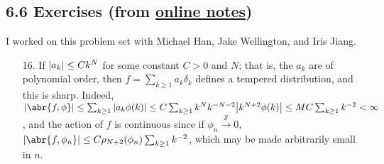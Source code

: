 \documentclass[11pt,leqno]{article}
\theoremstyle{plain}
\theoremstyle{definition}
\numberwithin{equation}{section}
\numberwithin{lem}{section}
\begin{document}
\subsection*{6.6 Exercises (from \href{https://users.oden.utexas.edu/~arbogast/appMath08c.pdf}{online notes})}
I worked on this problem set with Michael Han, Jake Wellington, and Iris Jiang.
\begin{enumerate}
    \item[16.] If $\abs{a_k}\leq Ck^N$ for some constant $C>0$ and $N$; that is, the $a_k$ are of polynomial order, then $f = \sum_{k\geq 1}a_k\delta_k$ defines a tempered distribution, and this is sharp. Indeed, $\abs{\abr{f,\phi}} \leq \sum_{k\geq 1}\abs{a_k\phi(k)} \leq C\sum_{k\geq 1}k^Nk^{-N-2}\abs{k^{N+2}\phi(k)}\leq MC\sum_{k\geq 1}k^{-2}<\infty$, and the action of $f$ is continuous since if $\phi_n\xrightarrow{\mathcal S} 0$, $\abs{\abr{f,\phi_n}} \leq C\rho_{N+2}(\phi_n)\sum_{k\geq 1}k^{-2}$, which may be made arbitrarily small in $n$.
    

\end{enumerate}
\end{document}
